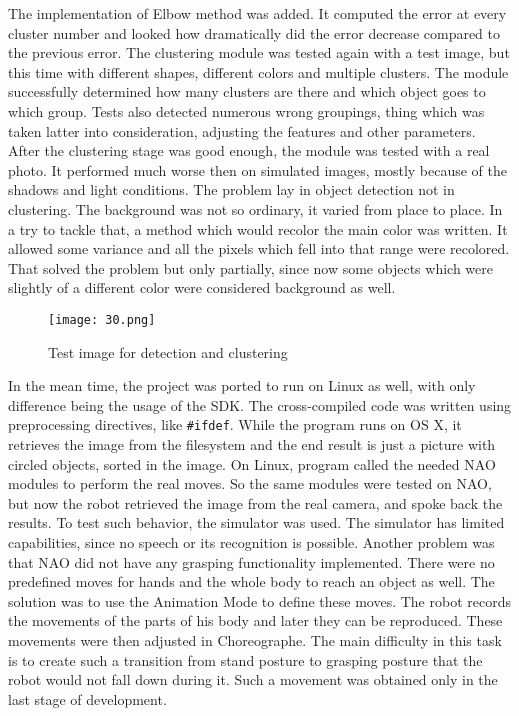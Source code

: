         The implementation of Elbow method was added. It computed the error at every cluster number and looked how dramatically did the error decrease compared to the previous error. The clustering module was tested again with a test image, but this time with different shapes, different colors and multiple clusters. The module successfully determined how many clusters are there and which object goes to which group. Tests also detected numerous wrong groupings, thing which was taken latter into consideration, adjusting the features and other parameters. After the clustering stage was good enough, the module was tested with a real photo. It performed much worse then on simulated images, mostly because of the shadows and light conditions. The problem lay in object detection not in clustering. The background was not so ordinary, it varied from place to place. In a try to tackle that, a method which would recolor the main color was written. It allowed some variance and all the pixels which fell into that range were recolored. That solved the problem but only partially, since now some objects which were slightly of a different color were considered background as well.

        \begin{figure}[t!]
            \centering
            \texttt{[image: 30.png]} 
            \caption{Test image for detection and clustering}
            \label{simpleShape}
        \end{figure}

        In the mean time, the project was ported to run on Linux as well, with only difference being the usage of the SDK. The cross-compiled code was written using preprocessing directives, like \verb|#ifdef|. While the program runs on OS X, it retrieves the image from the filesystem and the end result is just a picture with circled objects, sorted in the image. On Linux, program called the needed NAO modules to perform the real moves. So the same modules were tested on NAO, but now the robot retrieved the image from the real camera, and spoke back the results. To test such behavior, the simulator was used. The simulator has limited capabilities, since no speech or its recognition is possible. Another problem was that NAO did not have any grasping functionality implemented. There were no predefined moves for hands and the whole body to reach an object as well. The solution was to use the Animation Mode to define these moves. The robot records the movements of the parts of his body and later they can be reproduced. These movements were then adjusted in Choreographe. The main difficulty in this task is to create such a transition from stand posture to grasping posture that the robot would not fall down during it. Such a movement was obtained only in the last stage of development. 

